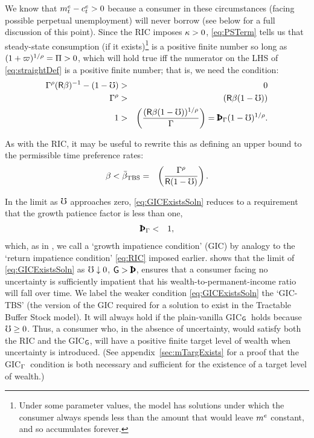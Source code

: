 \documentclass{handout}
\begin{document}
We know that $m^{e}_{t}-c^{e}_{t} > 0$ because a consumer in these
circumstances (facing possible perpetual unemployment) will never
borrow (see below for a full discussion of this point). 
Since the RIC imposes $\kappa>0$, \eqref{eq:PSTerm} tells
us that steady-state consumption (if it exists)\footnote{Under some parameter values, the model has solutions under which the consumer always spends less than the amount that would leave $m^{e}$ constant, and so accumulates forever.} is a positive finite number so long as $(1+\varpi)^{1/\rho}=\Pi > 0$, which will hold true iff the numerator on the LHS of
\eqref{eq:straightDef} is a positive finite number; that is, we need the
condition:
\begin{eqnarray}
        \PGro^{\CRRA}(\Rfree\Discount)^{-1}-(1-\urate) & > & 0  \\
       \PGro^{\CRRA} & > & (\Rfree \Discount (1-\urate))
\\     1 & > & \left(\frac{(\Rfree \Discount (1-\urate))^{1/\CRRA}}{\PGro}\right) = \PatPGro (1-\urate)^{1/\CRRA} 
  \label{eq:GICExistsSoln} \label{eq:GICTBS}
.\end{eqnarray}

As with the RIC, it may be useful to rewrite this as defining an upper bound to the permissible time preference rates: \providecommand{\DiscountMaxGICTBS}{\bar{\Discount}_{\text{TBS}}}
\begin{eqnarray}
\Discount < \DiscountMaxGICTBS & = & \left(\frac{\PGro^{\CRRA}}{\Rfree(1-\urate)}\right) \label{eq:DiscountMaxGICTBS}
.
\end{eqnarray}


\providecommand{\GICPGro}{GIC$_{\PGro}$}
\providecommand{\GICWGro}{GIC$_{\WGro}$}
In the limit as $\mho$ approaches zero, \eqref{eq:GICExistsSoln} reduces to a requirement that the growth patience factor is less than one,
\begin{eqnarray}
  \PatPGro & < & 1 \label{eq:GICPGro}
,\end{eqnarray}
which, as in ,  we call a `growth impatience condition' (GIC) by analogy to the `return impatience condition' \eqref{eq:RIC} imposed earlier.   shows that the limit of \eqref{eq:GICExistsSoln} as $\mho \downarrow 0$, $\WGro > \Pat$, ensures that a consumer facing no uncertainty is sufficiently impatient that his wealth-to-permanent-income ratio will fall over time.  
We label the weaker condition \eqref{eq:GICExistsSoln} the `GIC-TBS' (the version of the GIC required for a solution to exist in the Tractable Buffer Stock model).  It will always hold if the plain-vanilla \GICWGro~holds because $\mho \geq 0$.  Thus, a consumer who, in the absence of uncertainty, would satisfy both the RIC and the \GICWGro, will have a positive finite target level of wealth when uncertainty is introduced.  (See appendix~\ref{sec:mTargExists} for a proof that the \GICPGro~condition is both necessary and sufficient for the existence of a target level of wealth.)
\end{document}
